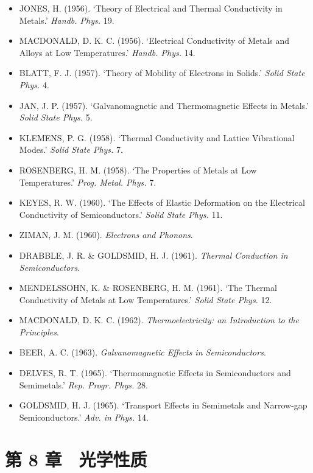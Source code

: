 \begin{itemize}[leftmargin=2em, itemsep=0.2em]
\item JONES, H. (1956). `Theory of Electrical and Thermal Conductivity in Metals.' \emph{Handb. Phys.} 19.
\item MACDONALD, D. K. C. (1956). `Electrical Conductivity of Metals and Alloys at Low Temperatures.' \emph{Handb. Phys.} 14.
\item BLATT, F. J. (1957). `Theory of Mobility of Electrons in Solids.' \emph{Solid State Phys.} 4.
\item JAN, J. P. (1957). `Galvanomagnetic and Thermomagnetic Effects in Metals.' \emph{Solid State Phys.} 5.
\item KLEMENS, P. G. (1958). `Thermal Conductivity and Lattice Vibrational Modes.' \emph{Solid State Phys.} 7.
\item ROSENBERG, H. M. (1958). `The Properties of Metals at Low Temperatures.' \emph{Prog. Metal. Phys.} 7.
\item KEYES, R. W. (1960). `The Effects of Elastic Deformation on the Electrical Conductivity of Semiconductors.' \emph{Solid State Phys.} 11.
\item ZIMAN, J. M. (1960). \emph{Electrons and Phonons}.
\item DRABBLE, J. R. \& GOLDSMID, H. J. (1961). \emph{Thermal Conduction in Semiconductors}.
\item MENDELSSOHN, K. \& ROSENBERG, H. M. (1961). `The Thermal Conductivity of Metals at Low Temperatures.' \emph{Solid State Phys.} 12.
\item MACDONALD, D. K. C. (1962). \emph{Thermoelectricity: an Introduction to the Principles}.
\item BEER, A. C. (1963). \emph{Galvanomagnetic Effects in Semiconductors}.
\item DELVES, R. T. (1965). `Thermomagnetic Effects in Semiconductors and Semimetals.' \emph{Rep. Progr. Phys.} 28.
\item GOLDSMID, H. J. (1965). `Transport Effects in Semimetals and Narrow-gap Semiconductors.' \emph{Adv. in Phys.} 14.
\end{itemize}

\section*{第 8 章　光学性质}

